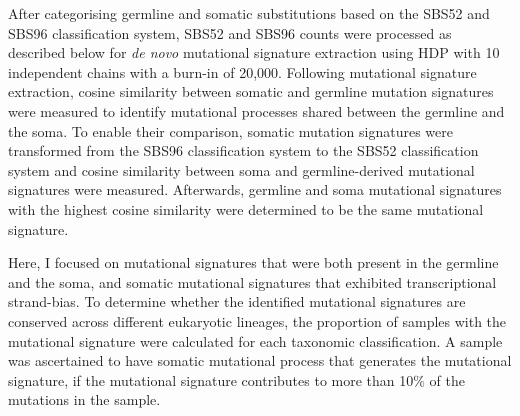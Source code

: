 After categorising germline and somatic substitutions based on the SBS52 and SBS96 classification system, SBS52 and SBS96 counts were processed as described below for \textit{de novo} mutational signature extraction using HDP \cite{hdp2018} with 10 independent chains with a burn-in of 20,000. Following mutational signature extraction, cosine similarity between somatic and germline mutation signatures were measured to identify mutational processes shared between the germline and the soma. To enable their comparison, somatic mutation signatures were transformed from the SBS96 classification system to the SBS52 classification system and cosine similarity between soma and germline-derived mutational signatures were measured. Afterwards, germline and soma mutational signatures with the highest cosine similarity were determined to be the same mutational signature. 

Here, I focused on mutational signatures that were both present in the germline and the soma, and somatic mutational signatures that exhibited transcriptional strand-bias. To determine whether the identified mutational signatures are conserved across different eukaryotic lineages, the proportion of samples with the mutational signature were calculated for each taxonomic classification. A sample was ascertained to have somatic mutational process that generates the mutational signature, if the mutational signature contributes to more than 10\% of the mutations in the sample.

\newpage

